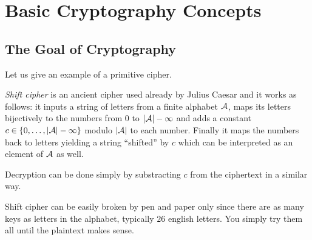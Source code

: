 \section{Basic Cryptography Concepts}
\label{sec:cryptobasics}

\subsection{The Goal of Cryptography}





Let us give an example of a primitive cipher.

\begin{example}
\label{ex:shift}
	{\em Shift cipher} is an ancient cipher used already by Julius Caesar and it works as follows: it inputs a string of letters from a finite alphabet $\cal A$, maps its letters bijectively to the numbers from $0$ to $|\cal A|-1$ and adds a constant $c\in\{0 , \ldots , |\cal A|-1\}$ modulo $|\cal A|$ to each number. Finally it maps the numbers back to letters yielding a string ``shifted'' by $c$ which can be interpreted as an element of $\cal A$ as well.
	
	Decryption can be done simply by substracting $c$ from the ciphertext in a similar way.
\end{example}

Shift cipher can be easily broken by pen and paper only since there are as many keys as letters in the alphabet, typically $26$ english letters. You simply try them all until the plaintext makes sense.

